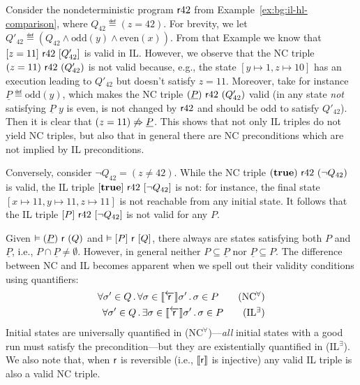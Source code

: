 \begin{example}\label{ex:sil:nc-and-il}
	Consider the nondeterministic program $\mathsf{r} 42$ from Example~\ref{ex:bg:il-hl-comparison}, where $Q_{42} \eqdef (z = 42)$. For brevity, we let $Q'_{42} \eqdef (Q_{42} \land \text{odd}(y) \land \text{even}(x))$.
	From that Example we know that $[z = 11]~\mathsf{r} 42~[Q'_{42}]$ is valid in IL. However, we observe that the NC triple $(z = 11)~\mathsf{r} 42~(Q'_{42})$ is not valid because, e.g., the state $[y \mapsto 1, z \mapsto 10]$ has an execution leading to $Q'_{42}$ but doesn't satisfy $z = 11$.
	Moreover, take for instance $\underline{P} \eqdef \text{odd}(y)$, which makes the NC triple $(\underline{P})~\mathsf{r} 42~(Q'_{42})$ valid (in any state \emph{not} satisfying $\underline{P}$ $y$ is even, is not changed by $\mathsf{r} 42$ and should be odd to satisfy $Q'_{42}$). Then it is clear that $(z = 11) \notimplies \underline{P}$. This shows that not only IL triples do not yield NC triples, but also that in general there are NC preconditions which are not implied by IL preconditions.

	Conversely, consider $\lnot Q_{42} = (z \neq 42)$. While the NC triple $(\textbf{true})~\mathsf{r} 42~(\lnot Q_{42})$ is valid, the IL triple $[\textbf{true}]~\mathsf{r} 42~[\lnot Q_{42}]$ is not: for instance, the final state $[x \mapsto 11, y \mapsto 11, z \mapsto 11]$ is not reachable from any initial state. It follows that the IL triple $[P]~\mathsf{r} 42~[\lnot Q_{42}]$ is not valid for any $P$.
\end{example}

Given $\vDash (\underline{P})~\mathsf{r}~(Q)$ and $\vDash [P]~\mathsf{r}~[Q]$, there always are states satisfying both $P$ and $\underline{P}$, i.e., $P \cap \underline{P} \neq \emptyset$. However, in general neither $P \subseteq \underline{P}$ nor $\underline{P} \subseteq P$. The difference between NC and IL becomes apparent when we spell out their validity conditions using quantifiers:
\begin{align*}
	\forall \sigma' \in Q \sdot \forall \sigma\in \bwsem{\regr}\sigma' \sdot\sigma\in P
	\tag{NC$^{\forall}$} \\
	\forall \sigma' \in Q \sdot \exists \sigma\in \bwsem{\regr}\sigma' \sdot \sigma \in P
	\tag{IL$^{\exists}$}
\end{align*}
Initial states are universally quantified in (NC$^{\forall}$)---\emph{all} initial states with a good run must satisfy the precondition---but they are existentially quantified in (IL$^{\exists}$). We also note that, when $\mathsf{r}$ is reversible (i.e., $\llbracket\mathsf{r}\rrbracket$ is injective) any valid IL triple is also a valid NC triple.

